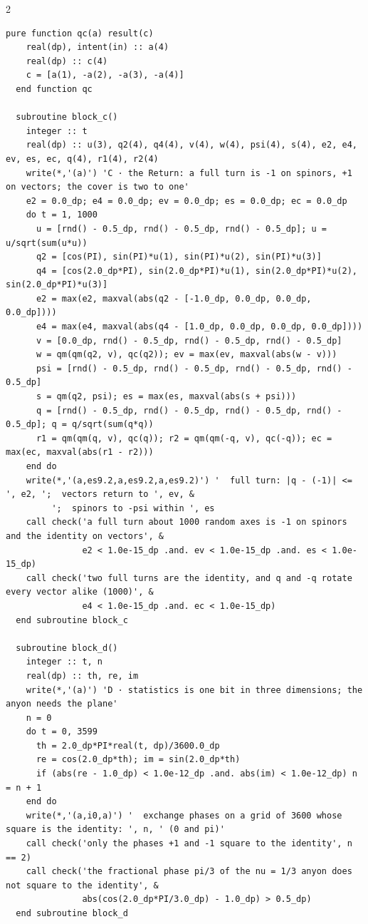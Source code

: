 \documentclass[10pt]{article}
\begin{document}
\begin{multicols}{2}
\begin{Verbatim}[fontsize=\fontsize{6.0}{6.9}\selectfont,breaklines,breakanywhere,breaksymbolleft={}]
  pure function qc(a) result(c)
    real(dp), intent(in) :: a(4)
    real(dp) :: c(4)
    c = [a(1), -a(2), -a(3), -a(4)]
  end function qc

  subroutine block_c()
    integer :: t
    real(dp) :: u(3), q2(4), q4(4), v(4), w(4), psi(4), s(4), e2, e4, ev, es, ec, q(4), r1(4), r2(4)
    write(*,'(a)') 'C · the Return: a full turn is -1 on spinors, +1 on vectors; the cover is two to one'
    e2 = 0.0_dp; e4 = 0.0_dp; ev = 0.0_dp; es = 0.0_dp; ec = 0.0_dp
    do t = 1, 1000
      u = [rnd() - 0.5_dp, rnd() - 0.5_dp, rnd() - 0.5_dp]; u = u/sqrt(sum(u*u))
      q2 = [cos(PI), sin(PI)*u(1), sin(PI)*u(2), sin(PI)*u(3)]
      q4 = [cos(2.0_dp*PI), sin(2.0_dp*PI)*u(1), sin(2.0_dp*PI)*u(2), sin(2.0_dp*PI)*u(3)]
      e2 = max(e2, maxval(abs(q2 - [-1.0_dp, 0.0_dp, 0.0_dp, 0.0_dp])))
      e4 = max(e4, maxval(abs(q4 - [1.0_dp, 0.0_dp, 0.0_dp, 0.0_dp])))
      v = [0.0_dp, rnd() - 0.5_dp, rnd() - 0.5_dp, rnd() - 0.5_dp]
      w = qm(qm(q2, v), qc(q2)); ev = max(ev, maxval(abs(w - v)))
      psi = [rnd() - 0.5_dp, rnd() - 0.5_dp, rnd() - 0.5_dp, rnd() - 0.5_dp]
      s = qm(q2, psi); es = max(es, maxval(abs(s + psi)))
      q = [rnd() - 0.5_dp, rnd() - 0.5_dp, rnd() - 0.5_dp, rnd() - 0.5_dp]; q = q/sqrt(sum(q*q))
      r1 = qm(qm(q, v), qc(q)); r2 = qm(qm(-q, v), qc(-q)); ec = max(ec, maxval(abs(r1 - r2)))
    end do
    write(*,'(a,es9.2,a,es9.2,a,es9.2)') '  full turn: |q - (-1)| <= ', e2, ';  vectors return to ', ev, &
         ';  spinors to -psi within ', es
    call check('a full turn about 1000 random axes is -1 on spinors and the identity on vectors', &
               e2 < 1.0e-15_dp .and. ev < 1.0e-15_dp .and. es < 1.0e-15_dp)
    call check('two full turns are the identity, and q and -q rotate every vector alike (1000)', &
               e4 < 1.0e-15_dp .and. ec < 1.0e-15_dp)
  end subroutine block_c

  subroutine block_d()
    integer :: t, n
    real(dp) :: th, re, im
    write(*,'(a)') 'D · statistics is one bit in three dimensions; the anyon needs the plane'
    n = 0
    do t = 0, 3599
      th = 2.0_dp*PI*real(t, dp)/3600.0_dp
      re = cos(2.0_dp*th); im = sin(2.0_dp*th)
      if (abs(re - 1.0_dp) < 1.0e-12_dp .and. abs(im) < 1.0e-12_dp) n = n + 1
    end do
    write(*,'(a,i0,a)') '  exchange phases on a grid of 3600 whose square is the identity: ', n, ' (0 and pi)'
    call check('only the phases +1 and -1 square to the identity', n == 2)
    call check('the fractional phase pi/3 of the nu = 1/3 anyon does not square to the identity', &
               abs(cos(2.0_dp*PI/3.0_dp) - 1.0_dp) > 0.5_dp)
  end subroutine block_d


\end{Verbatim}
\end{multicols}
\end{document}
